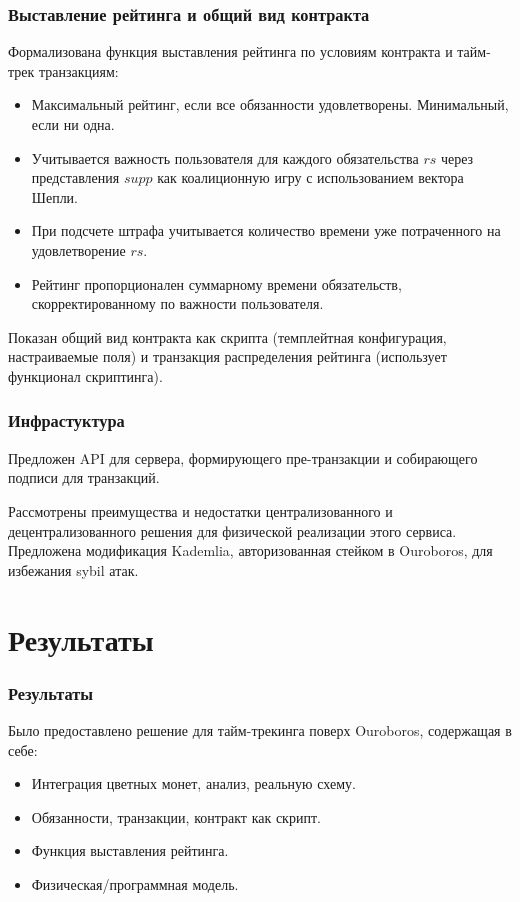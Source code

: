 \documentclass[11pt,handout,pdf,hyperref={unicode}]{beamer}
\begin{document}
\begin{frame}
  \frametitle{Выставление рейтинга и общий вид контракта}

  Формализована функция выставления рейтинга по условиям контракта и
  тайм-трек транзакциям:
  \begin{itemize}
  \item Максимальный рейтинг, если все обязанности
    удовлетворены. Минимальный, если ни одна.
  \item Учитывается важность пользователя для каждого обязательства
    $rs$ через представления $supp$ как коалиционную игру с
    использованием вектора Шепли.
  \item При подсчете штрафа учитывается количество времени уже
    потраченного на удовлетворение $rs$.
  \item Рейтинг пропорционален суммарному времени обязательств,
    скорректированному по важности пользователя.
  \end{itemize}

  Показан общий вид контракта как скрипта (темплейтная конфигурация,
  настраиваемые поля) и транзакция распределения рейтинга (использует
  функционал скриптинга).
\end{frame}

\begin{frame}
  \frametitle{Инфрастуктура}

  Предложен API для сервера, формирующего пре-транзакции и собирающего
  подписи для транзакций.

  Рассмотрены преимущества и недостатки централизованного и
  децентрализованного решения для физической реализации этого
  сервиса. Предложена модификация Kademlia, авторизованная стейком в
  Ouroboros, для избежания sybil атак.
\end{frame}

\section{Результаты}

\begin{frame}
  \frametitle{Результаты}

  Было предоставлено решение для тайм-трекинга поверх Ouroboros,
  содержащая в себе:
  \begin{itemize}
  \item Интеграция цветных монет, анализ, реальную схему.
  \item Обязанности, транзакции, контракт как скрипт.
  \item Функция выставления рейтинга.
  \item Физическая/программная модель.
  \end{itemize}
\end{frame}
\end{document}

